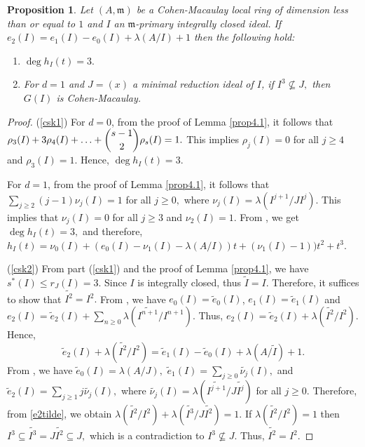 \documentclass[11pt]{amsart}
\theoremstyle{plain}
\newtheorem{proposition}[theorem]{Proposition}
\newcommand{\m}{\mathfrak{m}}
\newcommand{\wt}{\widetilde}
\theoremstyle{plain}
\begin{document}
\begin{proposition} \label{csk}
    Let $(A, \m) $ be a Cohen-Macaulay local ring of dimension less than or equal to $1$ and $I$ an  $\m$-primary integrally closed ideal. If $e_{2}(I)=e_{1}(I)-e_{0}(I)+\lambda(A/I)+1$ then the following hold:
    \begin{enumerate}[\normalfont(i)]
        \item \label{csk1} $\deg h_I(t)= 3.$
        \item \label{csk2} For $d=1$ and $J=(x)$ a minimal reduction ideal of $I$, if $I^3\nsubseteq J,$ then $G(I)$ is Cohen-Macaulay.
    \end{enumerate}
    
\end{proposition}

\begin{proof}
  (\ref{csk1}) For $d=0$, from the proof of Lemma \ref{prop4.1}, it follows that $\rho_{3}(I)+3\rho_{4}(I)+\ldots+\dbinom{s-1}{2} \rho_{s}(I)=1.$ This implies $\rho_{j}(I)=0$ for all $j \geq 4$ and $\rho_3(I)=1.$ Hence,  $\deg h_I(t) =3.$ %

For $d=1$, from the proof of Lemma \ref{prop4.1}, it follows that $\displaystyle \sum_{j\geq2}(j-1)\nu_{j}(I)=1$ for all $j\geq 0,$ where $\nu_j(I)=\lambda(I^{j+1}/JI^j)$. This implies that $\nu_{j}(I)=0$ for all $j \geq 3$ and $\nu_2(I)=1.$ From \cite[Theorem 2.5$(c)$]{rossi2010hilbert}, we get $\deg h_I(t) = 3,$ and therefore,  $h_{I}(t)=\nu_{0}(I)+(e_{0}(I)-\nu_{1}(I)-\lambda(A/I))t+(\nu_{1}(I)-1))t^{2}+t^3.$

\noindent
(\ref{csk2}) From part (\ref{csk1}) and the proof of Lemma \ref{prop4.1}, we have $s^*(I)\leq r_J(I)=3.$ Since $I$ is integrally closed, thus $\wt{I}=I$. Therefore, it suffices to show that $\wt{I^2}=I^2.$ 
From \cite[1.5(b)]{Part2}, we have $e_{0}(I)=\widetilde{e}_{0}(I)$,   $e_{1}(I)=\widetilde{e}_{1}(I)$ and $e_{2}(I)=\widetilde{e}_{2}(I)+\displaystyle \sum_{n \geq 0}\lambda(\widetilde{I^{n+1}}/I^{n+1})$. Thus, $e_{2}(I)=\widetilde{e}_{2}(I)+\lambda(\widetilde{I^{2}}/I^{2}).$ Hence,
 \begin{equation}\label{e2tilde}
     \widetilde{e}_{2}(I)+\lambda(\widetilde{I^{2}}/I^{2})=\widetilde{e}_{1}(I)-\widetilde{e}_{0}(I)+\lambda(A/\wt{I})+1.
 \end{equation}
  From \cite[Theorem 2.5$(c)$]{rossi2010hilbert}, we have $\wt{e}_0(I)=\lambda(A/J),$ $\wt{e}_{1}(I)=\displaystyle \sum_{j\geq0}\wt{\nu_j}(I),$ and $\wt{e}_{2}(I)=\displaystyle \sum_{j\geq1}j\wt{\nu_j}(I),$ where $\wt{\nu_j}(I)=\lambda(\wt{I^{j+1}}/J\wt{I^j})$ for all $j\geq 0.$ Therefore, from \eqref{e2tilde}, we obtain $\lambda(\wt{I^2}/I^2)+\lambda(\wt{I^3}/J\wt{I^2})=1.$ If $\lambda(\wt{I^2}/I^2)=1$ then $I^3\subseteq \wt{I^3}=J\wt{I^2}\subseteq J,$ which is a contradiction to $I^3\nsubseteq J.$ Thus, $\widetilde{I^{2}}=I^{2}$.
\end{proof}
\end{document}
